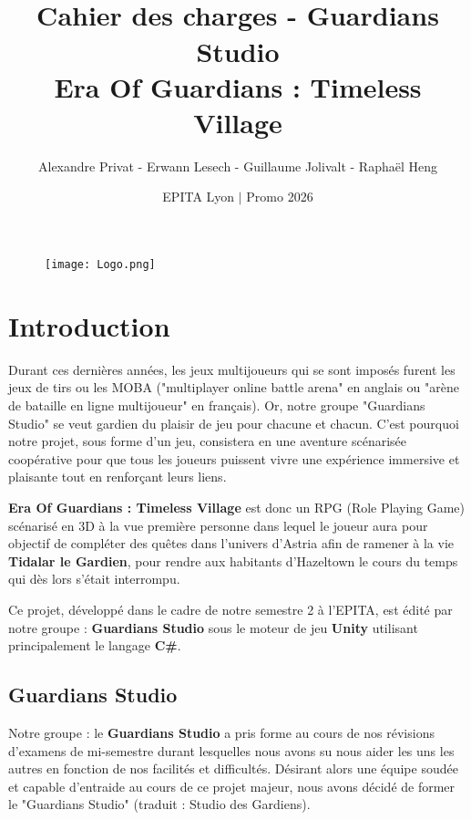 \documentclass[12pt]{article}
\title {
\HRule \\[0.4cm]
    Cahier des charges - Guardians Studio
    \\
    \textbf{Era Of Guardians : Timeless Village}
\HRule \\[1cm]
}
\author {
    Alexandre Privat - Erwann Lesech - Guillaume Jolivalt - Raphaël Heng
}
\date {
    EPITA Lyon $|$ Promo 2026 
}
\begin{document}
    
    \maketitle
    \begin{figure}[h]
    \texttt{[image: Logo.png]}
    \centering
    \end{figure}
    \clearpage
    \tableofcontents
    \clearpage
    
    \section{Introduction}
        Durant ces dernières années, les jeux multijoueurs qui se sont imposés furent les jeux de tirs ou les MOBA ("multiplayer online battle arena" en anglais ou "arène de bataille en ligne multijoueur" en français). Or, notre groupe "Guardians Studio" se veut gardien du plaisir de jeu pour chacune et chacun. C'est pourquoi notre projet, sous forme d'un jeu, consistera en une aventure scénarisée coopérative pour que tous les joueurs puissent vivre une expérience immersive et plaisante tout en renforçant leurs liens.
        \\
       \par\textbf {Era Of Guardians : Timeless Village} est donc un RPG (Role Playing Game) scénarisé en 3D à la vue première personne dans lequel le joueur aura pour objectif de compléter des quêtes dans l'univers d'Astria afin de ramener à la vie \textbf{Tidalar le Gardien}, pour rendre aux habitants d'Hazeltown le cours du temps qui dès lors s'était interrompu.
       \\
       \par Ce projet, développé dans le cadre de notre semestre 2 à l'EPITA, est édité par notre groupe : \textbf{Guardians Studio} sous le moteur de jeu \textbf{Unity} utilisant principalement le langage \textbf{C\#}.
       \\
       

        \subsection{Guardians Studio}
        Notre groupe : le \textbf{Guardians Studio} a pris forme au cours de nos révisions d'examens de mi-semestre durant lesquelles nous avons su nous aider les uns les autres en fonction de nos facilités et difficultés. Désirant alors une équipe soudée et capable d'entraide au cours de ce projet majeur, nous avons décidé de former le "Guardians Studio" (traduit : Studio des Gardiens). 
        \\
        
\end{document}
